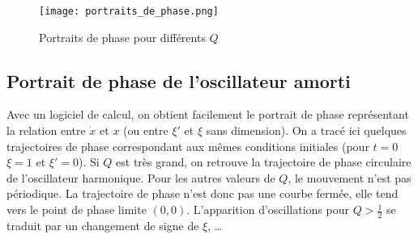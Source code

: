 \begin{figure}%
  \centering
  \texttt{[image: portraits\_de\_phase.png]}%
  \caption{Portraits de phase pour différents \(Q\)}%
  \label{fig:portrait_de_phase}
\end{figure}
%
\subsection{Portrait de phase de l'oscillateur amorti}%
\label{chap5-subsec:portraitdephasedeloscillateuramorti}%
%
Avec un logiciel de calcul, on obtient facilement le portrait de phase
représentant la relation entre \(\dot x\) et \(x\) (ou entre \(\xi'\) et
\(\xi\) sans dimension). On a tracé ici quelques trajectoires de phase
correspondant aux mêmes conditions initiales (pour \(t=0\) \(\xi=1\) et
\(\xi'=0\)). Si \(Q\) est très grand, on retrouve la trajectoire de phase
circulaire de l'oscillateur harmonique. Pour les autres valeurs de \(Q\), le
mouvement n'est pas périodique. La trajectoire de phase n'est donc pas une
courbe fermée, elle tend vers le point de phase limite \((0,0)\). L'apparition
d'oscillations pour \(Q>\frac{1}{2}\) se traduit par un changement de signe de
\(\xi\), \ldots
%
\clearpage
